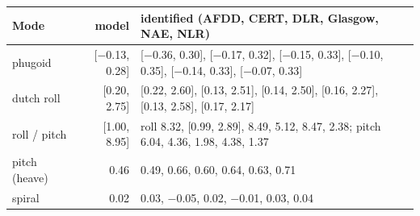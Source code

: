\begin{tabularx}{\columnwidth}{@{}lrX@{}}
\toprule
Mode & model & identified (AFDD, CERT, DLR, Glasgow, NAE, NLR) \\
\midrule
phugoid & [$-$0.13, 0.28] & [$-$0.36, 0.30], [$-$0.17, 0.32], [$-$0.15, 0.33], [$-$0.10, 0.35], [$-$0.14, 0.33], [$-$0.07, 0.33] \\
dutch roll & [0.20, 2.75] & [0.22, 2.60], [0.13, 2.51], [0.14, 2.50], [0.16, 2.27], [0.13, 2.58], [0.17, 2.17] \\
roll / pitch & [1.00, 8.95] & roll 8.32, [0.99, 2.89], 8.49, 5.12, 8.47, 2.38; pitch 6.04, 4.36, 1.98, 4.38, 1.37 \\
pitch (heave) & 0.46 & 0.49, 0.66, 0.60, 0.64, 0.63, 0.71 \\
spiral & 0.02 & 0.03, $-$0.05, 0.02, $-$0.01, 0.03, 0.04 \\
\bottomrule
\end{tabularx}
